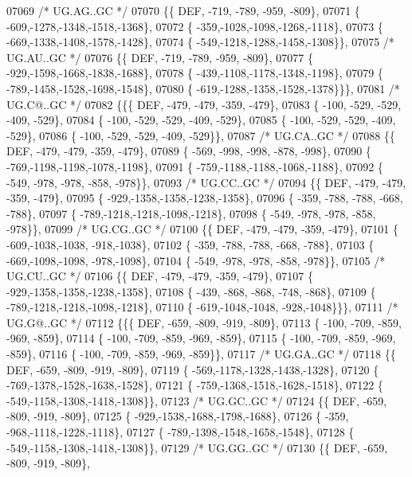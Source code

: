 \begin{DoxyCode}
07069 \textcolor{comment}{/* UG.AG..GC */}
07070 \{\{  DEF, -719, -789, -959, -809\},
07071 \{ -609,-1278,-1348,-1518,-1368\},
07072 \{ -359,-1028,-1098,-1268,-1118\},
07073 \{ -669,-1338,-1408,-1578,-1428\},
07074 \{ -549,-1218,-1288,-1458,-1308\}\},
07075 \textcolor{comment}{/* UG.AU..GC */}
07076 \{\{  DEF, -719, -789, -959, -809\},
07077 \{ -929,-1598,-1668,-1838,-1688\},
07078 \{ -439,-1108,-1178,-1348,-1198\},
07079 \{ -789,-1458,-1528,-1698,-1548\},
07080 \{ -619,-1288,-1358,-1528,-1378\}\}\},
07081 \textcolor{comment}{/* UG.C@..GC */}
07082 \{\{\{  DEF, -479, -479, -359, -479\},
07083 \{ -100, -529, -529, -409, -529\},
07084 \{ -100, -529, -529, -409, -529\},
07085 \{ -100, -529, -529, -409, -529\},
07086 \{ -100, -529, -529, -409, -529\}\},
07087 \textcolor{comment}{/* UG.CA..GC */}
07088 \{\{  DEF, -479, -479, -359, -479\},
07089 \{ -569, -998, -998, -878, -998\},
07090 \{ -769,-1198,-1198,-1078,-1198\},
07091 \{ -759,-1188,-1188,-1068,-1188\},
07092 \{ -549, -978, -978, -858, -978\}\},
07093 \textcolor{comment}{/* UG.CC..GC */}
07094 \{\{  DEF, -479, -479, -359, -479\},
07095 \{ -929,-1358,-1358,-1238,-1358\},
07096 \{ -359, -788, -788, -668, -788\},
07097 \{ -789,-1218,-1218,-1098,-1218\},
07098 \{ -549, -978, -978, -858, -978\}\},
07099 \textcolor{comment}{/* UG.CG..GC */}
07100 \{\{  DEF, -479, -479, -359, -479\},
07101 \{ -609,-1038,-1038, -918,-1038\},
07102 \{ -359, -788, -788, -668, -788\},
07103 \{ -669,-1098,-1098, -978,-1098\},
07104 \{ -549, -978, -978, -858, -978\}\},
07105 \textcolor{comment}{/* UG.CU..GC */}
07106 \{\{  DEF, -479, -479, -359, -479\},
07107 \{ -929,-1358,-1358,-1238,-1358\},
07108 \{ -439, -868, -868, -748, -868\},
07109 \{ -789,-1218,-1218,-1098,-1218\},
07110 \{ -619,-1048,-1048, -928,-1048\}\}\},
07111 \textcolor{comment}{/* UG.G@..GC */}
07112 \{\{\{  DEF, -659, -809, -919, -809\},
07113 \{ -100, -709, -859, -969, -859\},
07114 \{ -100, -709, -859, -969, -859\},
07115 \{ -100, -709, -859, -969, -859\},
07116 \{ -100, -709, -859, -969, -859\}\},
07117 \textcolor{comment}{/* UG.GA..GC */}
07118 \{\{  DEF, -659, -809, -919, -809\},
07119 \{ -569,-1178,-1328,-1438,-1328\},
07120 \{ -769,-1378,-1528,-1638,-1528\},
07121 \{ -759,-1368,-1518,-1628,-1518\},
07122 \{ -549,-1158,-1308,-1418,-1308\}\},
07123 \textcolor{comment}{/* UG.GC..GC */}
07124 \{\{  DEF, -659, -809, -919, -809\},
07125 \{ -929,-1538,-1688,-1798,-1688\},
07126 \{ -359, -968,-1118,-1228,-1118\},
07127 \{ -789,-1398,-1548,-1658,-1548\},
07128 \{ -549,-1158,-1308,-1418,-1308\}\},
07129 \textcolor{comment}{/* UG.GG..GC */}
07130 \{\{  DEF, -659, -809, -919, -809\},

\end{DoxyCode}
